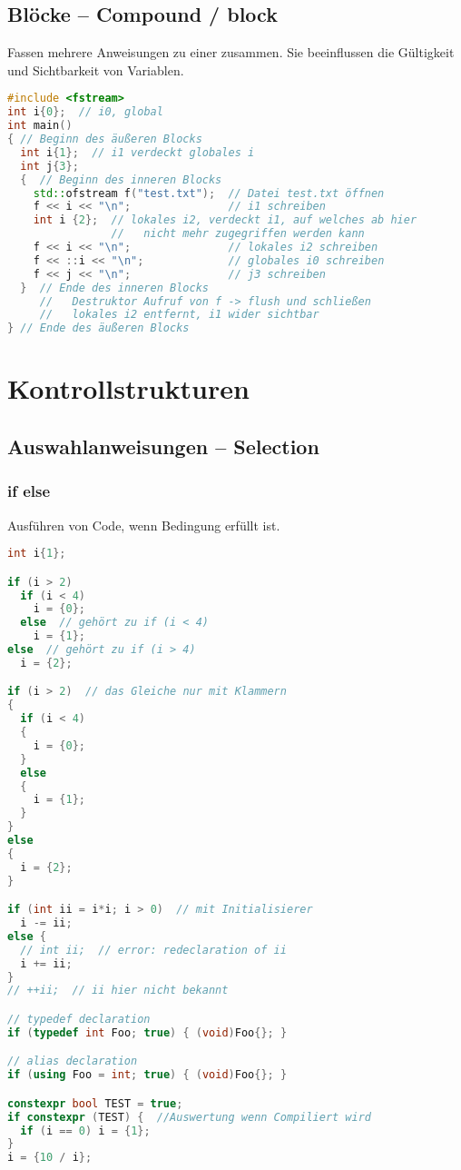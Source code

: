 \documentclass[10pt,twocolumn]{scrartcl}
\begin{document}
\subsection{Blöcke -- Compound / block}

Fassen mehrere Anweisungen zu einer zusammen. Sie beeinflussen die Gültigkeit
und Sichtbarkeit von Variablen.

\begin{lstlisting}[language=C++]
#include <fstream>
int i{0};  // i0, global
int main()
{ // Beginn des äußeren Blocks
  int i{1};  // i1 verdeckt globales i
  int j{3};
  {  // Beginn des inneren Blocks
    std::ofstream f("test.txt");  // Datei test.txt öffnen
    f << i << "\n";               // i1 schreiben
    int i {2};  // lokales i2, verdeckt i1, auf welches ab hier
                //   nicht mehr zugegriffen werden kann
    f << i << "\n";               // lokales i2 schreiben
    f << ::i << "\n";             // globales i0 schreiben
    f << j << "\n";               // j3 schreiben
  }  // Ende des inneren Blocks
     //   Destruktor Aufruf von f -> flush und schließen
     //   lokales i2 entfernt, i1 wider sichtbar
} // Ende des äußeren Blocks
\end{lstlisting}

\section{Kontrollstrukturen}

\subsection{Auswahlanweisungen -- Selection}

\subsubsection{if else}

Ausführen von Code, wenn Bedingung erfüllt ist.

\begin{lstlisting}[language=C++]
int i{1};

if (i > 2)
  if (i < 4)
    i = {0};
  else  // gehört zu if (i < 4)
    i = {1};
else  // gehört zu if (i > 4)
  i = {2};

if (i > 2)  // das Gleiche nur mit Klammern
{
  if (i < 4)
  {
    i = {0};
  }
  else
  {
    i = {1};
  }
}
else
{
  i = {2};
}

if (int ii = i*i; i > 0)  // mit Initialisierer
  i -= ii;
else {
  // int ii;  // error: redeclaration of ii
  i += ii;
}
// ++ii;  // ii hier nicht bekannt

// typedef declaration
if (typedef int Foo; true) { (void)Foo{}; }

// alias declaration
if (using Foo = int; true) { (void)Foo{}; }

constexpr bool TEST = true;
if constexpr (TEST) {  //Auswertung wenn Compiliert wird
  if (i == 0) i = {1};
}
i = {10 / i};
\end{lstlisting}
\end{document}

